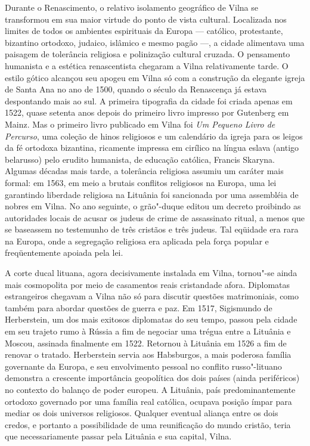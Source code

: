Durante o Renascimento, o relativo isolamento geográfico de Vilna se
transformou em sua maior virtude do ponto de vista cultural. Localizada
nos limites de todos os ambientes espirituais da Europa --- católico,
protestante, bizantino ortodoxo, judaico, islâmico e mesmo pagão ---, a
cidade alimentava uma paisagem de tolerância religiosa e polinização
cultural cruzada. O pensamento humanista e a estética renascentista
chegaram a Vilna relativamente tarde. O estilo gótico alcançou seu
apogeu em Vilna só com a construção da elegante igreja de Santa Ana no
ano de 1500, quando o século da Renascença já estava despontando mais ao
sul. A primeira tipografia da cidade foi criada apenas em 1522, quase
setenta anos depois do primeiro livro impresso por Gutenberg em Mainz.
Mas o primeiro livro publicado em Vilna foi \emph{Um Pequeno Livro de
Percurso}, uma coleção de hinos religiosos e um calendário da igreja
para os leigos da fé ortodoxa bizantina, ricamente impressa em cirílico
na língua eslava (antigo belarusso) pelo erudito humanista, de educação
católica, Francis Skaryna. Algumas décadas mais tarde, a tolerância
religiosa assumiu um caráter mais formal: em 1563, em meio a brutais
conflitos religiosos na Europa, uma lei garantindo liberdade religiosa
na Lituânia foi sancionada por uma assembléia de nobres em Vilna. No ano
seguinte, o grão"-duque editou um decreto proibindo as autoridades locais
de acusar os judeus de crime de assassinato ritual, a menos que se
baseassem no testemunho de três cristãos e três judeus. Tal eqüidade era
rara na Europa, onde a segregação religiosa era aplicada pela força
popular e freqüentemente apoiada pela lei.

A corte ducal lituana, agora decisivamente instalada em Vilna, tornou"-se
ainda mais cosmopolita por meio de casamentos reais cristandade afora.
Diplomatas estrangeiros chegavam a Vilna não só para discutir questões
matrimoniais, como também para abordar questões de guerra e paz. Em
1517, Sigismundo de Herberstein, um dos mais exitosos diplomatas do seu
tempo, passou pela cidade em seu trajeto rumo à Rússia a fim de negociar
uma trégua entre a Lituânia e Moscou, assinada finalmente em 1522.
Retornou à Lituânia em 1526 a fim de renovar o tratado. Herberstein
servia aos Habsburgos, a mais poderosa família governante da Europa, e
seu envolvimento pessoal no conflito russo"-lituano demonstra a crescente
importância geopolítica dos dois países (ainda periféricos) no contexto
do balanço de poder europeu. A Lituânia, país predominantemente ortodoxo
governado por uma família real católica, ocupava posição ímpar para
mediar os dois universos religiosos. Qualquer eventual aliança entre os
dois credos, e portanto a possibilidade de uma reunificação do mundo
cristão, teria que necessariamente passar pela Lituânia e sua capital,
Vilna.

